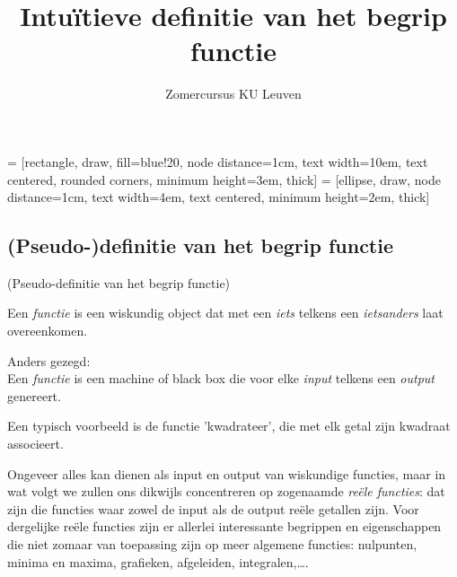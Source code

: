 \documentclass{ximera}
\author{Zomercursus KU Leuven}
\title{Intuïtieve definitie van het begrip functie}
\begin{document}
\begin{abstract}

\end{abstract}
\maketitle  

 = [rectangle, draw, fill=blue!20, node distance=1cm, text width=10em, text centered, rounded corners, minimum height=3em, thick]
 = [ellipse, draw, node distance=1cm, text width=4em, text centered, minimum height=2em, thick]

\subsection{(Pseudo-)definitie van het begrip functie}

\begin{definition} (Pseudo-definitie van het begrip functie)\label{fctie:def:pseudodef}
    
Een  \textit{functie} is een wiskundig object dat met een \textit{iets} telkens een \textit{ietsanders} laat overeenkomen. 


Anders gezegd: \\
Een \textit{functie} is een machine of black box die voor elke \textit{input} telkens een \textit{output} genereert.
\end{definition}

Een typisch voorbeeld is de functie 'kwadrateer', die met elk getal zijn kwadraat associeert.

Ongeveer alles kan dienen als input en output van wiskundige functies, maar in wat volgt we zullen ons dikwijls concentreren op zogenaamde \textit{reële functies}: dat zijn die functies waar zowel de input als de output reële getallen zijn. Voor dergelijke reële functies zijn er allerlei interessante begrippen en eigenschappen die niet zomaar van toepassing zijn op meer algemene functies: nulpunten, minima en maxima, grafieken, afgeleiden, integralen,\ldots.

\begin{center}
\end{center}
\end{document}

